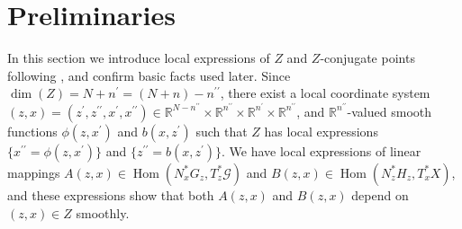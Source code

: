 \documentclass[a4paper,11pt,reqno]{amsart}
\theoremstyle{definition}
\theoremstyle{remark}
\begin{document}
\section{Preliminaries}
\label{section:local}
In this section we introduce local expressions of $Z$ and $Z$-conjugate points following 
\cite{MazzucchelliSaloTzou}, and confirm basic facts used later. 
Since $\dim(Z)=N+n^\prime=(N+n)-n^{\prime\prime}$, 
there exist a local coordinate system  
$(z,x)=(z^\prime,z^{\prime\prime},x^\prime,x^{\prime\prime})\in\mathbb{R}^{N-n^{\prime\prime}}\times\mathbb{R}^{n^{\prime\prime}}\times\mathbb{R}^{n^\prime}\times\mathbb{R}^{n^{\prime\prime}}$, 
and $\mathbb{R}^{n^{\prime\prime}}$-valued smooth functions 
$\phi(z,x^\prime)$ and $b(x,z^\prime)$ such that $Z$ has local expressions  
$\{x^{\prime\prime}=\phi(z,x^\prime)\}$ and $\{z^{\prime\prime}=b(x,z^\prime)\}$. 
We have local expressions of linear mappings 
$A(z,x) \in \operatorname{Hom}(N^\ast_xG_z,T^\ast_z\mathcal{G})$ 
and 
$B(z,x) \in \operatorname{Hom}(N^\ast_zH_z,T^\ast_xX)$, 
and these expressions show that both $A(z,x)$ and $B(z,x)$ depend on $(z,x) \in Z$ smoothly. 
%
%
\end{document}
